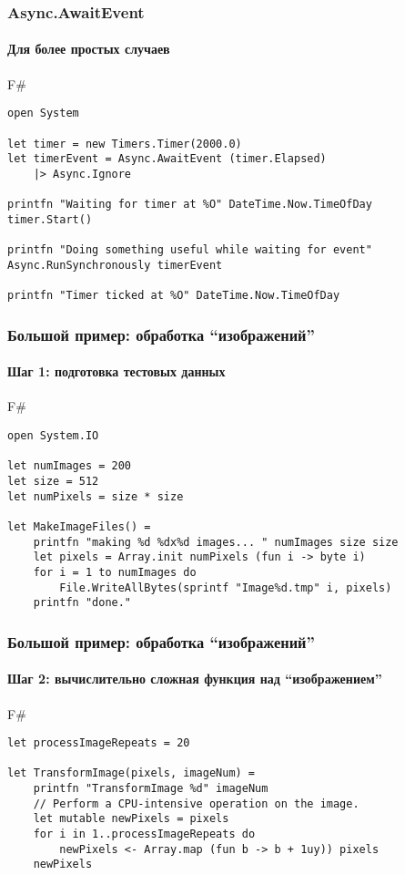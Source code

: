 \documentclass[xetex,mathserif,serif]{beamer}
\begin{document}
	\begin{frame}[fragile]
		\frametitle{Async.AwaitEvent}
		\framesubtitle{Для более простых случаев}
   		\begin{exampleblock}{F\#}
   			\begin{lstlisting}
open System

let timer = new Timers.Timer(2000.0)
let timerEvent = Async.AwaitEvent (timer.Elapsed) 
    |> Async.Ignore

printfn "Waiting for timer at %O" DateTime.Now.TimeOfDay
timer.Start()

printfn "Doing something useful while waiting for event"
Async.RunSynchronously timerEvent

printfn "Timer ticked at %O" DateTime.Now.TimeOfDay
\end{lstlisting}
\end{exampleblock}
\end{frame}

	\begin{frame}[fragile]
		\frametitle{Большой пример: обработка ``изображений''}
		\framesubtitle{Шаг 1: подготовка тестовых данных}
   		\begin{exampleblock}{F\#}
   			\begin{lstlisting}[basicstyle=\footnotesize]
open System.IO

let numImages = 200
let size = 512
let numPixels = size * size

let MakeImageFiles() =
    printfn "making %d %dx%d images... " numImages size size
    let pixels = Array.init numPixels (fun i -> byte i)
    for i = 1 to numImages do
        File.WriteAllBytes(sprintf "Image%d.tmp" i, pixels)
    printfn "done."
\end{lstlisting}
\end{exampleblock}
\end{frame}

	\begin{frame}[fragile]
		\frametitle{Большой пример: обработка ``изображений''}
		\framesubtitle{Шаг 2: вычислительно сложная функция над ``изображением''}
   		\begin{exampleblock}{F\#}
   			\begin{lstlisting}
let processImageRepeats = 20

let TransformImage(pixels, imageNum) =
    printfn "TransformImage %d" imageNum
    // Perform a CPU-intensive operation on the image.
    let mutable newPixels = pixels
    for i in 1..processImageRepeats do 
        newPixels <- Array.map (fun b -> b + 1uy)) pixels
    newPixels
\end{lstlisting}
\end{exampleblock}
\end{frame}
\end{document}
